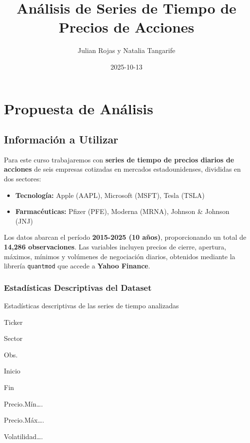 \documentclass[
]{book}
\title{Análisis de Series de Tiempo de Precios de Acciones}
\author{Julian Rojas y Natalia Tangarife}
\date{2025-10-13}
\providecommand{\tightlist}{%
  \setlength{\itemsep}{0pt}\setlength{\parskip}{0pt}}
\begin{document}
\maketitle

{
\setcounter{tocdepth}{1}
\tableofcontents
}
\chapter*{Propuesta de Análisis}\label{propuesta-de-anuxe1lisis}

\section{Información a Utilizar}\label{informaciuxf3n-a-utilizar}

Para este curso trabajaremos con \textbf{series de tiempo de precios diarios de acciones} de seis empresas cotizadas en mercados estadounidenses, divididas en dos sectores:

\begin{itemize}
\tightlist
\item
  \textbf{Tecnología:} Apple (AAPL), Microsoft (MSFT), Tesla (TSLA)
\item
  \textbf{Farmacéuticas:} Pfizer (PFE), Moderna (MRNA), Johnson \& Johnson (JNJ)
\end{itemize}

Los datos abarcan el período \textbf{2015-2025 (10 años)}, proporcionando un total de \textbf{14,286 observaciones}. Las variables incluyen precios de cierre, apertura, máximos, mínimos y volúmenes de negociación diarios, obtenidos mediante la librería \texttt{quantmod} que accede a \textbf{Yahoo Finance}.

\subsection{Estadísticas Descriptivas del Dataset}\label{estaduxedsticas-descriptivas-del-dataset}

\label{tab:tabla-resumen}Estadísticas descriptivas de las series de tiempo analizadas

Ticker

Sector

Obs.

Inicio

Fin

Precio.Mín\ldots.

Precio.Máx\ldots.

Volatilidad\ldots.
\end{document}
